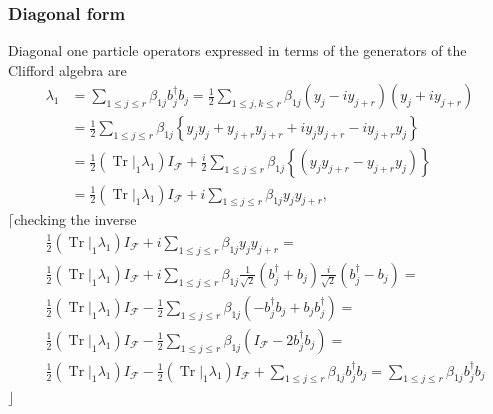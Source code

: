 \documentclass[aps, preprint]{revtex4}
\begin{document}
\subsubsection{Diagonal form}
Diagonal one particle operators expressed in terms of the generators of the Clifford algebra are
\begin{align}\lambda _{1} &  =\sum _{1 \leq j \leq r}\beta _{1 j} b_{j}^{ \dag } b_{j} =\frac{1}{2} \sum _{1 \leq j ,k \leq r}\beta _{1 j} \left (y_{j} -i y_{j +r}\right ) \left (y_{j} +i y_{j +r}\right ) \\
 &  =\frac{1}{2} \sum _{1 \leq j \leq r}\beta _{1 j} \left \{y_{j} y_{j} +y_{j +r} y_{j +r} +i y_{j} y_{j +r} -i y_{j +r} y_{j}\right \} \\
 &  =\frac{1}{2} \left (\left .\ensuremath{\operatorname*{Tr}}\right \vert _{1} \lambda _{1}\right ) I_{\mathcal{F}} +\frac{i}{2} \sum _{1 \leq j \leq r}\beta _{1 j} \left \{\left (y_{j} y_{j +r} -y_{j +r} y_{j}\right )\right \} \\
 &  =\frac{1}{2} \left (\left .\ensuremath{\operatorname*{Tr}}\right \vert _{1} \lambda _{1}\right ) I_{\mathcal{F}} +i \sum _{1 \leq j \leq r}\beta _{1 j} y_{j} y_{j +r}\text{,}\end{align}$\lceil $checking the inverse
\begin{align} & \frac{1}{2} \left (\left .\ensuremath{\operatorname*{Tr}}\right \vert _{1} \lambda _{1}\right ) I_{\mathcal{F}} +i \sum _{1 \leq j \leq r}\beta _{1 j} y_{j} y_{j +r} = \\
 & \frac{1}{2} \left (\left .\ensuremath{\operatorname*{Tr}}\right \vert _{1} \lambda _{1}\right ) I_{\mathcal{F}} +i \sum _{1 \leq j \leq r}\beta _{1 j} \frac{1}{\sqrt{2}} \left (b_{j}^{ \dag } +b_{j}\right ) \frac{i}{\sqrt{2}} \left (b_{j}^{ \dag } -b_{j}\right ) = \\
 & \frac{1}{2} \left (\left .\ensuremath{\operatorname*{Tr}}\right \vert _{1} \lambda _{1}\right ) I_{\mathcal{F}} -\frac{1}{2} \sum _{1 \leq j \leq r}\beta _{1 j} \left ( -b_{j}^{ \dag } b_{j} +b_{j} b_{j}^{ \dag }\right ) = \\
 & \frac{1}{2} \left (\left .\ensuremath{\operatorname*{Tr}}\right \vert _{1} \lambda _{1}\right ) I_{\mathcal{F}} -\frac{1}{2} \sum _{1 \leq j \leq r}\beta _{1 j} \left (I_{\mathcal{F}} -2 b_{j}^{ \dag } b_{j}\right ) = \\
 & \frac{1}{2} \left (\left .\ensuremath{\operatorname*{Tr}}\right \vert _{1} \lambda _{1}\right ) I_{\mathcal{F}} -\frac{1}{2} \left (\left .\ensuremath{\operatorname*{Tr}}\right \vert _{1} \lambda _{1}\right ) I_{\mathcal{F}} +\sum _{1 \leq j \leq r}\beta _{1 j} b_{j}^{ \dag } b_{j} =\sum _{1 \leq j \leq r}\beta _{1 j} b_{j}^{ \dag } b_{j}\end{align}$\rfloor $ 
\end{document}
